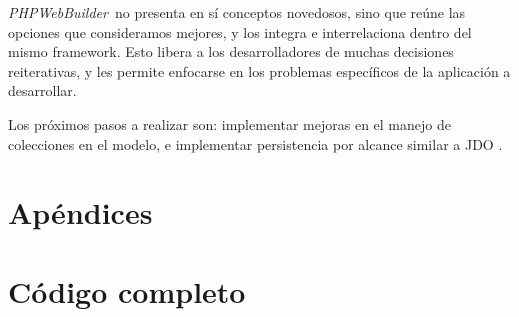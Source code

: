 \documentclass[a4paper,10pt,draft]{article}
\newcommand{\PWB}{\emph{PHPWebBuilder}}
\begin{document}
\PWB\ no presenta en sí conceptos novedosos, sino que reúne las opciones que consideramos mejores, y los integra e interrelaciona dentro del mismo framework. Esto libera a los desarrolladores de muchas decisiones reiterativas, y les permite enfocarse en los problemas específicos de la aplicación a desarrollar.

Los próximos pasos a realizar son: implementar mejoras en el manejo de colecciones en el modelo, e implementar persistencia por alcance similar a JDO \cite{jpox}.







\setcounter{section}{0}
\section*{Apéndices}
\section{Código completo}

\begin{lgrind}

\end{lgrind}

\begin{lgrind}

\end{lgrind}
\end{document}

